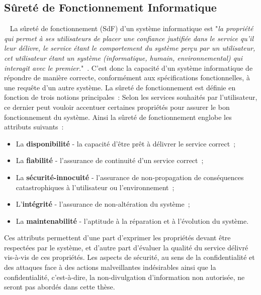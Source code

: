 \documentclass[french, a4paper, 11pt, twoside, pdftex]{StyleThese}
\begin{document}
	\subsection{Sûreté de Fonctionnement Informatique}~\label{sec:SureteDeFonctionnement}
		La sûreté de fonctionnement (SdF) d’un système informatique est "\textit{la propriété qui permet à ses utilisateurs de placer une confiance justifiée dans le service qu’il leur délivre, le service étant le comportement du système perçu par un utilisateur, cet utilisateur étant un système (informatique, humain, environnemental) qui interagit avec le premier.}"~\cite{laprie_guide_1996}. C’est donc la capacité d’un système informatique de répondre de manière correcte, conformément aux spécifications fonctionnelles, à une requête d’un autre système.  
		La sûreté de fonctionnement est définie en fonction de trois notions principales~:  
		Selon les services souhaités par l’utilisateur, ce dernier peut vouloir accentuer certaines propriétés pour assurer le bon fonctionnement du système. Ainsi la sûreté de fonctionnement englobe les attributs suivants~:  
		\begin{itemize}
			\item 	La \textbf{disponibilité} - la capacité d’être prêt à délivrer le service correct~; 
			\item 	La \textbf{fiabilité} - l’assurance de continuité d’un service correct~; 
			\item 	La \textbf{sécurité-innocuité} - l’assurance de non-propagation de conséquences catastrophiques à l’utilisateur ou l’environnement~; 
			\item 	L’\textbf{intégrité} - l’assurance de non-altération du système~; 
			\item 	La \textbf{maintenabilité} - l’aptitude à la réparation et à l’évolution du système. 
		\end{itemize} 
		Ces attributs permettent d’une part d’exprimer les propriétés devant être respectées par le système, et d’autre part d’évaluer la qualité du service délivré vis-à-vis de ces propriétés. Les aspects de sécurité, au sens de la confidentialité et des attaques face à des actions malveillantes indésirables ainsi que la confidentialité, c'est-à-dire, la non-divulgation d'information non autorisée, ne seront pas abordés dans cette thèse.
\end{document}
